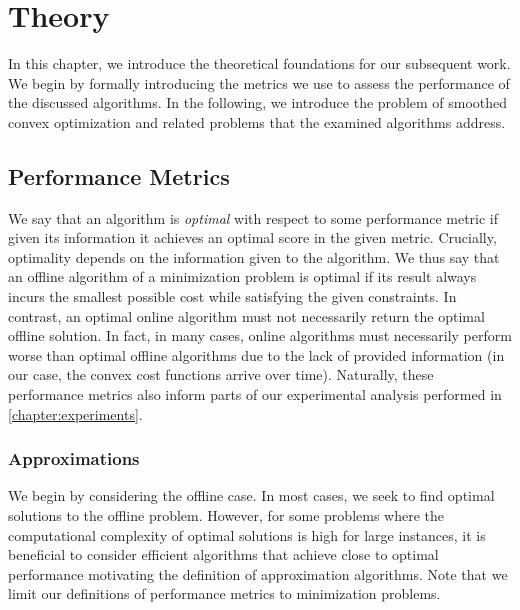 
\chapter{Theory}\label{chapter:theory}

In this chapter, we introduce the theoretical foundations for our subsequent work. We begin by formally introducing the metrics we use to assess the performance of the discussed algorithms. In the following, we introduce the problem of smoothed convex optimization and related problems that the examined algorithms address.

\section{Performance Metrics}\label{section:theory:performance_metrics}

We say that an algorithm is \textit{optimal} with respect to some performance metric if given its information it achieves an optimal score in the given metric. Crucially, optimality depends on the information given to the algorithm. We thus say that an offline algorithm of a minimization problem is optimal if its result always incurs the smallest possible cost while satisfying the given constraints. In contrast, an optimal online algorithm must not necessarily return the optimal offline solution. In fact, in many cases, online algorithms must necessarily perform worse than optimal offline algorithms due to the lack of provided information (in our case, the convex cost functions arrive over time). Naturally, these performance metrics also inform parts of our experimental analysis performed in \autoref{chapter:experiments}.

\subsection{Approximations}

We begin by considering the offline case. In most cases, we seek to find optimal solutions to the offline problem. However, for some problems where the computational complexity of optimal solutions is high for large instances, it is beneficial to consider efficient algorithms that achieve close to optimal performance motivating the definition of approximation algorithms. Note that we limit our definitions of performance metrics to minimization problems.

